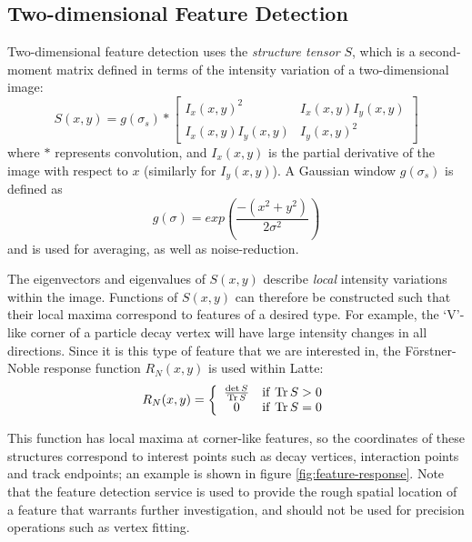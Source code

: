 \subsection{Two-dimensional Feature Detection}\label{sec:two-dim-feature-detection}
Two-dimensional feature detection uses the \emph{structure tensor} $S$, which is a second-moment matrix defined in terms of the intensity variation of a two-dimensional image:~\citep{Morgan2010}
\begin{equation}\label{eqn:structure_tensor}
    S(x,y) = g(\sigma_s) \ast \left[ \begin{array}{cc} I_x(x,y)^2 & I_x(x,y)I_y(x,y) \\ I_x(x,y)I_y(x,y) & I_y(x,y)^2 \end{array} \right]
\end{equation}
where $\ast$ represents convolution, and $I_x(x,y)$ is the partial derivative of the image with respect to $x$ (similarly for $I_y(x,y)$). A Gaussian window $g(\sigma_s)$ is defined as
\begin{equation}\label{eqn:feature_det_gaussian_window}
    g(\sigma) = exp\left( \frac{-(x^2 + y^2)}{2\sigma^2} \right)
\end{equation}
and is used for averaging, as well as noise-reduction.

The eigenvectors and eigenvalues of $S(x,y)$ describe \emph{local} intensity variations within the image. Functions of $S(x,y)$ can therefore be constructed such that their local maxima correspond to features of a desired type. For example, the `V'-like corner of a particle decay vertex will have large intensity changes in all directions. Since it is this type of feature that we are interested in, the F\"orstner-Noble response function $R_N(x,y)$ is used within Latte:
\begin{equation}\label{eqn:forstner-noble}
    R_N(x,y) = \left\{ \begin{array}{cl} \frac{\det S}{\mathrm{Tr}\, S} & \mathrm{if~} \mathrm{Tr}\, S > 0 \\ 0 & \mathrm{if~} \mathrm{Tr}\, S = 0 \end{array} \right.
\end{equation}

This function has local maxima at corner-like features, so the coordinates of these structures correspond to interest points such as decay vertices, interaction points and track endpoints; an example is shown in figure \ref{fig:feature-response}. Note that the feature detection service is used to provide the rough spatial location of a feature that warrants further investigation, and should not be used for precision operations such as vertex fitting.

